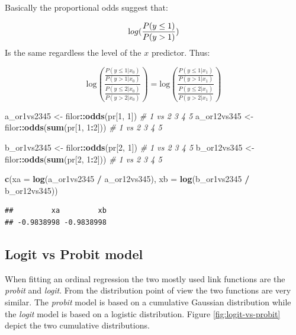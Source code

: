 \documentclass[
  man,floatsintext]{apa6}
\newenvironment{Shaded}{\begin{snugshade}}{\end{snugshade}}
\newcommand{\AttributeTok}[1]{\textcolor[rgb]{0.13,0.29,0.53}{#1}}
\newcommand{\CommentTok}[1]{\textcolor[rgb]{0.56,0.35,0.01}{\textit{#1}}}
\newcommand{\DecValTok}[1]{\textcolor[rgb]{0.00,0.00,0.81}{#1}}
\newcommand{\FunctionTok}[1]{\textcolor[rgb]{0.13,0.29,0.53}{\textbf{#1}}}
\newcommand{\NormalTok}[1]{#1}
\newcommand{\OtherTok}[1]{\textcolor[rgb]{0.56,0.35,0.01}{#1}}
\newcommand{\SpecialCharTok}[1]{\textcolor[rgb]{0.81,0.36,0.00}{\textbf{#1}}}
\begin{document}
Basically the proportional odds suggest that:

\[
\text log(\frac{P(y \leq 1)}{P(y > 1)})
\]
Is the same regardless the level of the \(x\) predictor. Thus:

\[
\text{log}\left(\frac{\frac{P(y \leq 1|x_0)}{P(y > 1|x_0)}}{\frac{P(y \leq 2|x_0)}{P(y > 2|x_0)}}\right) = \text{log}\left(\frac{\frac{P(y \leq 1|x_1)}{P(y > 1|x_1)}}{\frac{P(y \leq 2|x_1)}{P(y > 2|x_1)}}\right)
\]

\begin{Shaded}
\begin{Highlighting}[]
\NormalTok{a\_or1vs2345 }\OtherTok{\textless{}{-}}\NormalTok{ filor}\SpecialCharTok{::}\FunctionTok{odds}\NormalTok{(pr[}\DecValTok{1}\NormalTok{, }\DecValTok{1}\NormalTok{]) }\CommentTok{\# 1 vs 2 3 4 5}
\NormalTok{a\_or12vs345 }\OtherTok{\textless{}{-}}\NormalTok{ filor}\SpecialCharTok{::}\FunctionTok{odds}\NormalTok{(}\FunctionTok{sum}\NormalTok{(pr[}\DecValTok{1}\NormalTok{, }\DecValTok{1}\SpecialCharTok{:}\DecValTok{2}\NormalTok{])) }\CommentTok{\# 1 vs 2 3 4 5}

\NormalTok{b\_or1vs2345 }\OtherTok{\textless{}{-}}\NormalTok{ filor}\SpecialCharTok{::}\FunctionTok{odds}\NormalTok{(pr[}\DecValTok{2}\NormalTok{, }\DecValTok{1}\NormalTok{]) }\CommentTok{\# 1 vs 2 3 4 5}
\NormalTok{b\_or12vs345 }\OtherTok{\textless{}{-}}\NormalTok{ filor}\SpecialCharTok{::}\FunctionTok{odds}\NormalTok{(}\FunctionTok{sum}\NormalTok{(pr[}\DecValTok{2}\NormalTok{, }\DecValTok{1}\SpecialCharTok{:}\DecValTok{2}\NormalTok{])) }\CommentTok{\# 1 vs 2 3 4 5}

\FunctionTok{c}\NormalTok{(}\AttributeTok{xa =} \FunctionTok{log}\NormalTok{(a\_or1vs2345 }\SpecialCharTok{/}\NormalTok{ a\_or12vs345), }\AttributeTok{xb =} \FunctionTok{log}\NormalTok{(b\_or1vs2345 }\SpecialCharTok{/}\NormalTok{ b\_or12vs345))}
\end{Highlighting}
\end{Shaded}

\begin{verbatim}
##         xa         xb 
## -0.9838998 -0.9838998
\end{verbatim}

\subsection{Logit vs Probit model}\label{logit-vs-probit-model}

When fitting an ordinal regression the two mostly used link functions are the \emph{probit} and \emph{logit}. From the distribution point of view the two functions are very similar. The \emph{probit} model is based on a cumulative Gaussian distribution while the \emph{logit} model is based on a logistic distribution. Figure \ref{fig:logit-vs-probit} depict the two cumulative distributions.
\end{document}
